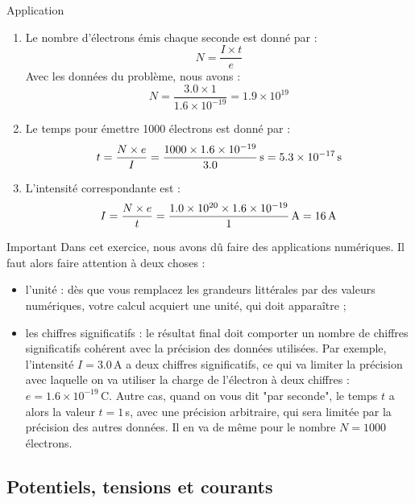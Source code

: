 \documentclass[10pt,a5paper,notitlepage]{book}
\begin{document}
\begin{NCexem}{Application}
	\begin{enumerate}
		\item Le nombre d'électrons émis chaque seconde est donné par :
		\begin{equation}
			N = \dfrac{I \times t}{e}
		\end{equation}
		Avec les données du problème, nous avons :
		\begin{equation}
			N = \dfrac{3.0 \times 1}{1.6\times 10^{-19}} = 1.9\times 10^{19}
		\end{equation}
		\item Le temps pour émettre 1000 électrons est donné par :
		\begin{equation}
			t = \dfrac{N\times e}{I} = \dfrac{1000 \times 1.6\times 10^{-19}}{3.0}\,{\rm s} = 5.3\times 10^{-17}\,{\rm s}
		\end{equation}
		\item L'intensité correspondante est :
		\begin{equation}
			I = \dfrac{N\times e}{t} = \dfrac{1.0\times 10^{20} \times 1.6\times 10^{-19}}{1}\,{\rm A} = 16\,{\rm A}
		\end{equation}
	\end{enumerate}
\end{NCexem}

\begin{impo}{Important}
	Dans cet exercice, nous avons dû faire des applications numériques. Il faut alors faire attention à deux choses :
	\begin{itemize}
		\item l'unité : dès que vous remplacez les grandeurs littérales par des valeurs numériques, votre calcul acquiert une unité, qui doit apparaître ;
		\item les chiffres significatifs : le résultat final doit comporter un nombre de chiffres significatifs cohérent avec la précision des données utilisées. Par exemple, l'intensité $I = 3.0\,$A a deux chiffres significatifs, ce qui va limiter la précision avec laquelle on va utiliser la charge de l'électron à deux chiffres : $e = 1.6\times 10^{-19}\,$C. Autre cas, quand on vous dit "par seconde", le temps $t$ a alors la valeur $t = 1\,$s, avec une précision arbitraire, qui sera limitée par la précision des autres données. Il en va de même pour le nombre $N = 1000$ électrons.
	\end{itemize}
\end{impo}

\subsection{Potentiels, tensions et courants}
\end{document}
